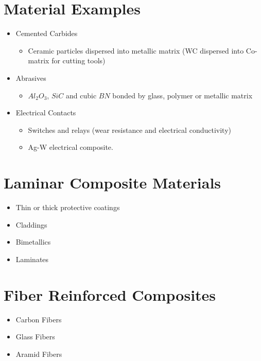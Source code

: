 \documentclass{article}
\begin{document}
\section*{Material Examples}
\begin{itemize}
    \item Cemented Carbides
    \begin{itemize}
        \item Ceramic particles dispersed into metallic matrix (WC dispersed into Co-matrix for cutting tools)
    \end{itemize}
    \item Abrasives
    \begin{itemize}
        \item $Al_2O_3$, $SiC$ and cubic $BN$ bonded by glass, polymer or metallic matrix
    \end{itemize}
    \item Electrical Contacts
    \begin{itemize}
        \item Switches and relays (wear resistance and electrical conductivity)
        \item Ag-W electrical composite.
    \end{itemize}
\end{itemize}

\section*{Laminar Composite Materials}
\begin{itemize}
    \item Thin or thick protective coatings
    \item Claddings
    \item Bimetallics
    \item Laminates
\end{itemize}

\section*{Fiber Reinforced Composites}
\begin{itemize}
    \item Carbon Fibers
    \item Glass Fibers
    \item Aramid Fibers
\end{itemize}
\end{document}
